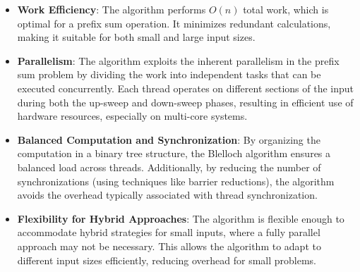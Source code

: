 \documentclass[letterpaper,12pt]{article}
\theoremstyle{remark}
\begin{document}
\begin{itemize}
    \item \textbf{Work Efficiency}: The algorithm performs $O(n)$ total work, which is optimal for a prefix sum operation. It minimizes redundant calculations, making it suitable for both small and large input sizes.
    \item \textbf{Parallelism}: The algorithm exploits the inherent parallelism in the prefix sum problem by dividing the work into independent tasks that can be executed concurrently. Each thread operates on different sections of the input during both the up-sweep and down-sweep phases, resulting in efficient use of hardware resources, especially on multi-core systems.
    \item \textbf{Balanced Computation and Synchronization}: By organizing the computation in a binary tree structure, the Blelloch algorithm ensures a balanced load across threads. Additionally, by reducing the number of synchronizations (using techniques like barrier reductions), the algorithm avoids the overhead typically associated with thread synchronization.
    \item \textbf{Flexibility for Hybrid Approaches}: The algorithm is flexible enough to accommodate hybrid strategies for small inputs, where a fully parallel approach may not be necessary. This allows the algorithm to adapt to different input sizes efficiently, reducing overhead for small problems.
\end{itemize}
\end{document}
